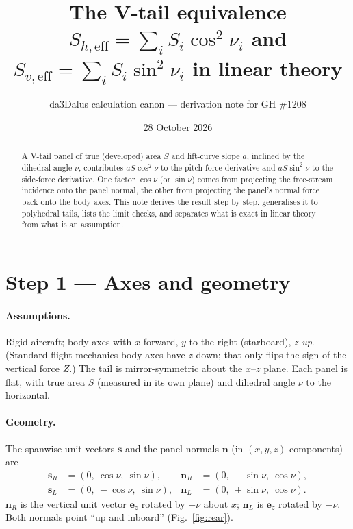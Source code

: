 \documentclass[11pt,a4paper]{article}
\title{The V-tail equivalence\\[2pt]
\large $S_{h,\mathrm{eff}} = \sum_i S_i\cos^2\nu_i$ and $S_{v,\mathrm{eff}} = \sum_i S_i\sin^2\nu_i$ in linear theory}
\author{da3Dalus calculation canon --- derivation note for GH \#1208}
\date{28 October 2026}
\newcommand{\vect}[1]{\mathbf{#1}}
\begin{document}
\maketitle

\begin{abstract}
A V-tail panel of true (developed) area $S$ and lift-curve slope $a$, inclined by the dihedral
angle $\nu$, contributes $a S\cos^2\nu$ to the pitch-force derivative and $a S\sin^2\nu$ to the
side-force derivative. One factor $\cos\nu$ (or $\sin\nu$) comes from projecting the free-stream
incidence onto the panel normal, the other from projecting the panel's normal force back onto the
body axes. This note derives the result step by step, generalises it to polyhedral tails, lists the
limit checks, and separates what is exact in linear theory from what is an assumption.
\end{abstract}

\section{Step 1 --- Axes and geometry}

\paragraph{Assumptions.} Rigid aircraft; body axes with $x$ forward, $y$ to the right
(starboard), $z$ \emph{up}. (Standard flight-mechanics body axes have $z$ down; that only flips the
sign of the vertical force $Z$.) The tail is mirror-symmetric about the $x$--$z$ plane. Each panel is
flat, with true area $S$ (measured in its own plane) and dihedral angle $\nu$ to the horizontal.

\paragraph{Geometry.} The spanwise unit vectors $\vect{s}$ and the panel normals $\vect{n}$ (in
$(x,y,z)$ components) are
\begin{align}
  \vect{s}_R &= (0,\ \cos\nu,\ \sin\nu), &
  \vect{n}_R &= (0,\ -\sin\nu,\ \cos\nu), \label{eq:nR}\\
  \vect{s}_L &= (0,\ -\cos\nu,\ \sin\nu), &
  \vect{n}_L &= (0,\ +\sin\nu,\ \cos\nu). \label{eq:nL}
\end{align}
$\vect{n}_R$ is the vertical unit vector $\vect{e}_z$ rotated by $+\nu$ about $x$; $\vect{n}_L$ is
$\vect{e}_z$ rotated by $-\nu$. Both normals point ``up and inboard'' (Fig.~\ref{fig:rear}).
\end{document}
